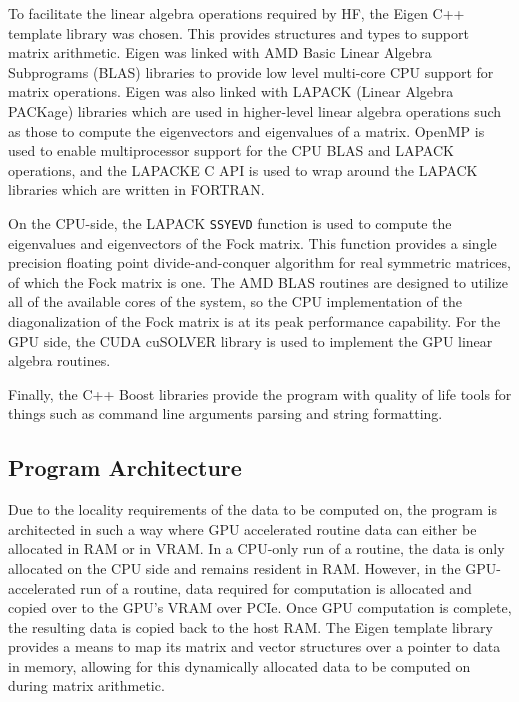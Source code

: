 \documentclass[conference, twoside]{IEEEtran}
\begin{document}
To facilitate the linear algebra operations required by HF, the Eigen \cite{eigen} C++ template library was chosen. This provides structures and types to support matrix arithmetic. Eigen was linked with AMD Basic Linear Algebra Subprograms (BLAS) libraries \cite{amd-blas} to provide low level multi-core CPU support for matrix operations. Eigen was also linked with LAPACK (Linear Algebra PACKage) \cite{lapack} libraries which are used in higher-level linear algebra operations such as those to compute the eigenvectors and eigenvalues of a matrix. OpenMP is used to enable multiprocessor support for the CPU BLAS and LAPACK operations, and the LAPACKE C API is used to wrap around the LAPACK libraries which are written in FORTRAN.

On the CPU-side, the LAPACK \texttt{SSYEVD} function is used to compute the eigenvalues and eigenvectors of the Fock matrix. This function provides a single precision floating point divide-and-conquer algorithm for real symmetric matrices, of which the Fock matrix is one. The AMD BLAS routines are designed to utilize all of the available cores of the system, so the CPU implementation of the diagonalization of the Fock matrix is at its peak performance capability. For the GPU side, the CUDA cuSOLVER library is used to implement the GPU linear algebra routines.

Finally, the C++ Boost libraries provide the program with quality of life tools for things such as command line arguments parsing and string formatting.

\subsection{Program Architecture} %

Due to the locality requirements of the data to be computed on, the program is architected in such a way where GPU accelerated routine data can either be allocated in RAM or in VRAM. In a CPU-only run of a routine, the data is only allocated on the CPU side and remains resident in RAM. However, in the GPU-accelerated run of a routine, data required for computation is allocated and copied over to the GPU's VRAM over PCIe. Once GPU computation is complete, the resulting data is copied back to the host RAM. The Eigen template library provides a means to map its matrix and vector structures over a pointer to data in memory, allowing for this dynamically allocated data to be computed on during matrix arithmetic.
\end{document}
